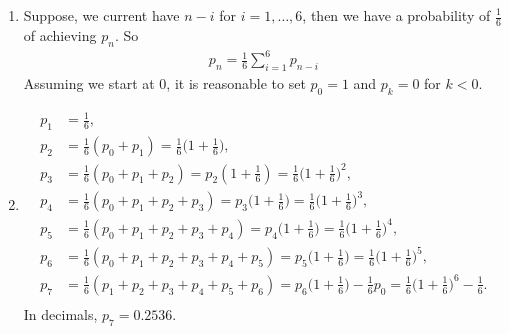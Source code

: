 

\setcounter{theorem}{47}

\begin{exercise}[BH.2.48]
\begin{solution}
	\begin{enumerate}
		\item Suppose, we current have $n-i$ for $i=1,\ldots,6$, then we have a probability of $\frac{1}{6}$ of achieving $p_{n}$. So
		\begin{align*}
			p_{n} = \frac{1}{6}\sum_{i=1}^{6}p_{n-i}
		\end{align*}
		Assuming we start at 0, it is reasonable to set $p_{0}=1$ and $p_{k}=0$ for $k<0$. 
		\item
		\begin{align*}
			p_{1} &= \frac{1}{6},\\
			p_{2} &= \frac{1}{6}(p_{0}+p_{1}) =\frac{1}{6}\bigg(1+\frac{1}{6}\bigg),\\
			p_{3} &= \frac{1}{6}(p_{0}+p_{1}+p_{2}) = p_{2}(1+\frac{1}{6})=\frac{1}{6}\bigg(1+\frac{1}{6}\bigg)^2,\\
			p_{4} & = \frac{1}{6}(p_{0}+p_{1}+p_{2}+p_{3})=p_{3}\bigg(1+\frac{1}{6}\bigg) = \frac{1}{6}\bigg(1+\frac{1}{6}\bigg)^3,\\
			p_{5} & = \frac{1}{6}(p_{0}+p_{1}+p_{2}+p_{3} + p_{4})=p_{4}\bigg(1+\frac{1}{6}\bigg) = \frac{1}{6}\bigg(1+\frac{1}{6}\bigg)^4,\\
			p_{6} & = \frac{1}{6}(p_{0}+p_{1}+p_{2}+p_{3}+p_{4}+p_{5})=p_{5}\bigg(1+\frac{1}{6}\bigg) = \frac{1}{6}\bigg(1+\frac{1}{6}\bigg)^5,\\
			p_{7} & = \frac{1}{6}(p_{1}+p_{2}+p_{3}+p_{4}+p_{5}+p_{6})=p_{6}\bigg(1+\frac{1}{6}\bigg)-\frac{1}{6}p_{0}  = \frac{1}{6}\bigg(1+\frac{1}{6}\bigg)^6-\frac{1}{6}.\\	
		\end{align*}
		In decimals, $p_{7}=0.2536$.
	\end{enumerate}
\end{solution}
\end{exercise}

